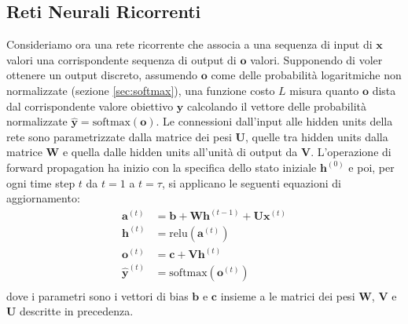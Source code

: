 \documentclass[12pt,a4paper]{report}
\begin{document}
    \subsection{Reti Neurali Ricorrenti}
    Consideriamo ora una rete ricorrente che associa a una sequenza di
    input di $\boldsymbol{x}$ valori una corrispondente sequenza di
    output di $\boldsymbol{o}$ valori. Supponendo di voler ottenere un
    output discreto, assumendo $\boldsymbol{o}$ come delle probabilit\`a
    logaritmiche non normalizzate (sezione \ref{sec:softmax}), una 
    funzione costo $L$ misura quanto $\boldsymbol{o}$ dista dal 
    corrispondente valore obiettivo $\boldsymbol{y}$ calcolando il 
    vettore delle probabilit\`a normalizzate $\boldsymbol{\hat{y}}=
    \text{softmax}(\boldsymbol{o})$. Le connessioni dall'input alle 
    hidden units della rete sono parametrizzate dalla matrice dei pesi 
    $\boldsymbol{U}$, quelle tra hidden units dalla matrice 
    $\boldsymbol{W}$ e quella dalle hidden units all'unit\`a di output 
    da $\boldsymbol{V}$. L'operazione di forward propagation ha inizio
    con la specifica dello stato iniziale $\boldsymbol{h}^{(0)}$ e poi,
    per ogni time step $t$ da $t=1$ a $t=\tau$, si applicano le seguenti
    equazioni di aggiornamento:
    \begin{align}
        \boldsymbol{a}^{(t)} &= \boldsymbol{b}+
            \boldsymbol{W}\boldsymbol{h}^{(t-1)}+
            \boldsymbol{U}\boldsymbol{x}^{(t)}\\
        \boldsymbol{h}^{(t)} &= \text{relu}(\boldsymbol{a}^{(t)})\\
        \boldsymbol{o}^{(t)} &= \boldsymbol{c}+
            \boldsymbol{V}\boldsymbol{h}^{(t)}\\
        \boldsymbol{\hat{y}}^{(t)} &= \text{softmax}
            (\boldsymbol{o}^{(t)})\\
    \end{align}
    dove i parametri sono i vettori di bias $\boldsymbol{b}$ e 
    $\boldsymbol{c}$ insieme a le matrici dei pesi $\boldsymbol{W}$, 
    $\boldsymbol{V}$ e $\boldsymbol{U}$ descritte in precedenza.
\end{document}
